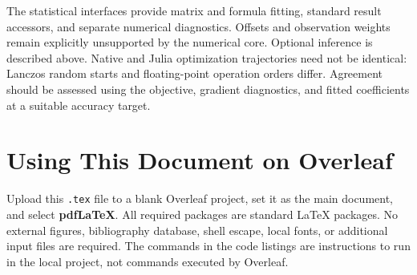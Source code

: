 \documentclass[11pt,a4paper]{article}
\newcommand{\code}[1]{\texttt{#1}}
\begin{document}
The statistical interfaces provide matrix and formula fitting, standard result accessors,
and separate numerical diagnostics. Offsets and observation weights remain explicitly
unsupported by the numerical core. Optional inference is described above.
Native and Julia optimization trajectories need not be identical: Lanczos random
starts and floating-point operation orders differ. Agreement should be assessed
using the objective, gradient diagnostics, and fitted coefficients at a suitable
accuracy target.

\section*{Using This Document on Overleaf}
Upload this \code{.tex} file to a blank Overleaf project, set it as the main
document, and select \textbf{pdfLaTeX}. All required packages are standard LaTeX
packages. No external figures, bibliography database, shell escape, local fonts,
or additional input files are required. The commands in the code listings are
instructions to run in the local project, not commands executed by Overleaf.
\end{document}
